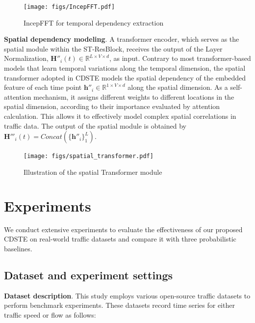 \documentclass[a4paper,fleqn,12pt]{cas-sc}
\begin{document}
\begin{figure}[pos=htbp,width=9cm,align=\centering]
  \centering 
  \texttt{[image: figs/IncepFFT.pdf]}
  \caption{IncepFFT for temporal dependency extraction}\label{fig:IncepFFT}
\end{figure}

\noindent\textbf{Spatial dependency modeling}. A transformer encoder, which serves as the spatial module within the ST-ResBlock, receives the output of the Layer Normalization, $\boldsymbol{H}''_{i}(t)\in\mathbb{R}^{L\times V\times d}$, as input. Contrary to most transformer-based models that learn temporal variations along the temporal dimension, the spatial transformer \citep{xu2020spatial} adopted in CDSTE models the spatial dependency of the embedded feature of each time point $\boldsymbol{h}''_{i}\in\mathbb{R}^{1\times V\times d}$ along the spatial dimension. As a self-attention mechanism, it assigns different weights to different locations in the spatial dimension, according to their importance evaluated by attention calculation. This allows it to effectively model complex spatial correlations in traffic data. The output of the spatial module is obtained by $\boldsymbol{H}'''_{i}(t) = Concat(\{\boldsymbol{h}''_{i}\}_{1}^{L})$.
\begin{figure}[pos=htbp,width=9cm,align=\centering]
  \centering 
  \texttt{[image: figs/spatial\_transformer.pdf]}
  \caption{Illustration of the spatial Transformer module}\label{fig:Transformer}
\end{figure}

\section{Experiments}\label{sec:CaseStudy}
We conduct extensive experiments to evaluate the effectiveness of our proposed CDSTE on real-world traffic datasets and compare it with three probabilistic baselines.

\subsection{Dataset and experiment settings}
\noindent\textbf{Dataset description}. This study employs various open-source traffic datasets to perform benchmark experiments. These datasets record time series for either traffic speed or flow as follows:
\end{document}
